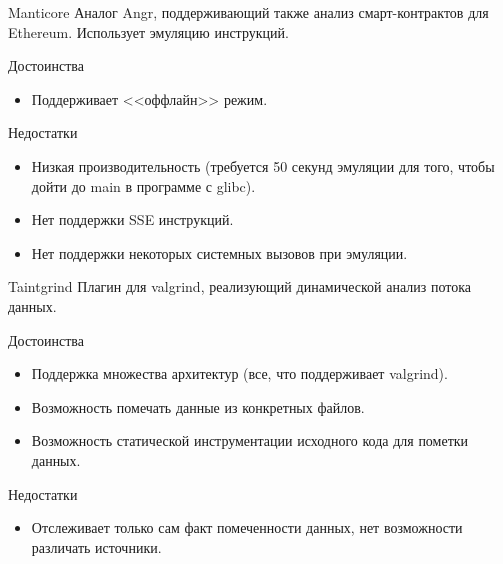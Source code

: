 \documentclass[10pt]{beamer}
\begin{document}
\begin{frame}{Manticore}
    Аналог Angr, поддерживающий также анализ смарт-контрактов для Ethereum. Использует эмуляцию инструкций.
    \begin{block}{Достоинства}
      \begin{itemize}
        \item Поддерживает <<оффлайн>> режим. %
      \end{itemize}
    \end{block}
        \begin{block}{Недостатки}
          \begin{itemize}
      \item Низкая производительность (требуется 50 секунд эмуляции для того, чтобы дойти до main в программе с glibc).
      \item Нет поддержки SSE инструкций.
      \item Нет поддержки некоторых системных вызовов при эмуляции.
      \end{itemize}
    \end{block}
\end{frame}

\begin{frame}{Taintgrind}
    Плагин для valgrind, реализующий динамической анализ потока данных.
    \begin{block}{Достоинства}
      \begin{itemize}
        \item Поддержка множества архитектур (все, что поддерживает valgrind).
        \item Возможность помечать данные из конкретных файлов.
        \item Возможность статической инструментации исходного кода для пометки данных.
      \end{itemize}
    \end{block}
        \begin{block}{Недостатки}
          \begin{itemize}
      \item Отслеживает только сам факт помеченности данных, нет возможности различать источники.
      \end{itemize}
    \end{block}
\end{frame}
\end{document}
